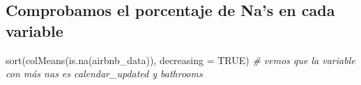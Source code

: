 \documentclass[
]{article}
\newenvironment{Shaded}{\begin{snugshade}}{\end{snugshade}}
\newcommand{\AttributeTok}[1]{\textcolor[rgb]{0.77,0.63,0.00}{#1}}
\newcommand{\CommentTok}[1]{\textcolor[rgb]{0.56,0.35,0.01}{\textit{#1}}}
\newcommand{\ConstantTok}[1]{\textcolor[rgb]{0.00,0.00,0.00}{#1}}
\newcommand{\FunctionTok}[1]{\textcolor[rgb]{0.00,0.00,0.00}{#1}}
\newcommand{\NormalTok}[1]{#1}
\begin{document}
\hypertarget{comprobamos-el-porcentaje-de-nas-en-cada-variable}{%
\subsection{Comprobamos el porcentaje de Na's en cada
variable}\label{comprobamos-el-porcentaje-de-nas-en-cada-variable}}

\begin{Shaded}
\begin{Highlighting}[]
\FunctionTok{sort}\NormalTok{(}\FunctionTok{colMeans}\NormalTok{(}\FunctionTok{is.na}\NormalTok{(airbnb\_data)), }\AttributeTok{decreasing =} \ConstantTok{TRUE}\NormalTok{) }\CommentTok{\# vemos que la variable con más na\textquotesingle{}s es calendar\_updated y bathrooms}
\end{Highlighting}
\end{Shaded}
\end{document}

